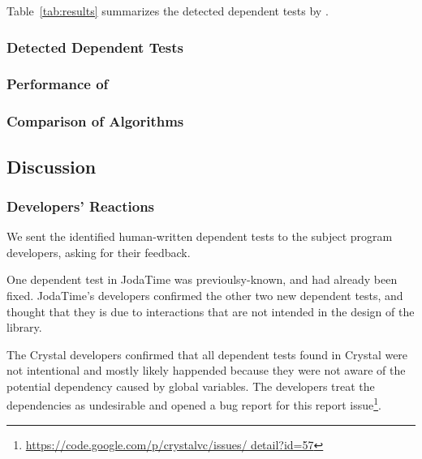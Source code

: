 Table~\ref{tab:results} summarizes the detected
dependent tests by \ourtool.

\subsubsection{Detected Dependent Tests}
\label{sec:detectedtests}


\subsubsection{Performance of \ourtool}
\label{sec:performance}

 

\subsubsection{Comparison of Algorithms}
\label{sec:algcomparison}





\subsection{Discussion}
\label{sec:expdiscussion}

\subsubsection{Developers' Reactions}

We sent the identified human-written dependent tests to the
subject program developers, asking for their feedback.

One dependent test in JodaTime was previoulsy-known,
and had already been fixed. JodaTime's
developers confirmed the other two new dependent
tests, and thought that they is due to interactions
that are not intended in the design of the library.

The Crystal developers confirmed that all dependent tests
found in Crystal were not intentional and mostly likely
happended because they were not aware of the potential dependency
caused by global variables. The developers treat the
dependencies as undesirable and opened a bug report for
this report issue\footnote{\url{https://code.google.com/p/crystalvc/issues/ detail?id=57}}.

